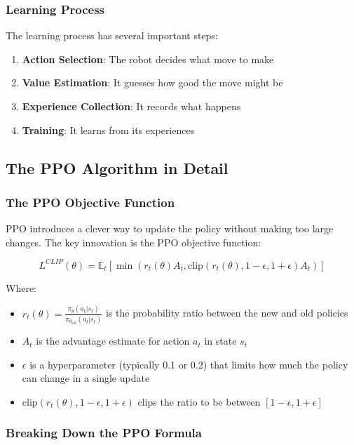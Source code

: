 \documentclass[11pt]{article}
\begin{document}
\subsubsection{Learning Process}

The learning process has several important steps:
\begin{enumerate}
    \item \textbf{Action Selection}: The robot decides what move to make
    \item \textbf{Value Estimation}: It guesses how good the move might be
    \item \textbf{Experience Collection}: It records what happens
    \item \textbf{Training}: It learns from its experiences
\end{enumerate}

\subsection{The PPO Algorithm in Detail}

\subsubsection{The PPO Objective Function}

PPO introduces a clever way to update the policy without making too large changes. The key innovation is the PPO objective function:

\begin{equation}
    L^{CLIP}(\theta) = \mathbb{E}_t \left[ \min(r_t(\theta) A_t, \text{clip}(r_t(\theta), 1-\epsilon, 1+\epsilon) A_t) \right]
\end{equation}

Where:
\begin{itemize}
    \item $r_t(\theta) = \frac{\pi_\theta(a_t|s_t)}{\pi_{\theta_{old}}(a_t|s_t)}$ is the probability ratio between the new and old policies
    \item $A_t$ is the advantage estimate for action $a_t$ in state $s_t$
    \item $\epsilon$ is a hyperparameter (typically 0.1 or 0.2) that limits how much the policy can change in a single update
    \item $\text{clip}(r_t(\theta), 1-\epsilon, 1+\epsilon)$ clips the ratio to be between $[1-\epsilon, 1+\epsilon]$
\end{itemize}

\subsubsection*{Breaking Down the PPO Formula}
\end{document}
